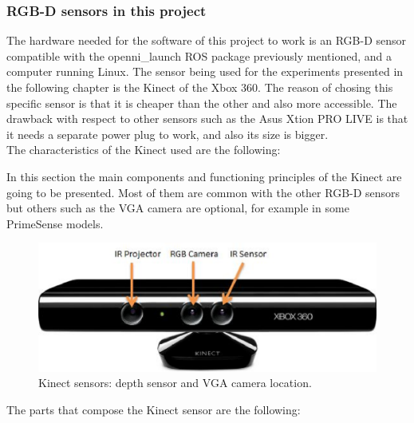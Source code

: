 \subsubsection{RGB-D sensors in this project}

 
The hardware needed for the software of this project to work is an RGB-D sensor compatible with the openni\_launch ROS package previously mentioned, and a computer running Linux. 
The sensor being used for the experiments presented in the following chapter is the Kinect of the Xbox 360. The reason of chosing this specific sensor is that it is cheaper than the other
and also more accessible. The drawback with respect to other sensors such as the Asus Xtion PRO LIVE\cite{xtion} is that it needs a separate power plug to work, and also its size is bigger. 
\\

The characteristics of the Kinect used are the following: 


In this section the main components and functioning principles of the Kinect are going to be presented. Most of them are common with the other RGB-D sensors but others such as the VGA camera are optional, for example in some PrimeSense\cite{PrimeSense} models. 

\begin{figure}[h]
	\begin{center}
\includegraphics[scale=0.5]{img/kinect/kinect2.eps}
	\caption[Kinect Sensors]{Kinect sensors: depth sensor and VGA camera location.}
	\end{center}
\end{figure}


The parts that compose the Kinect sensor are the following: 

